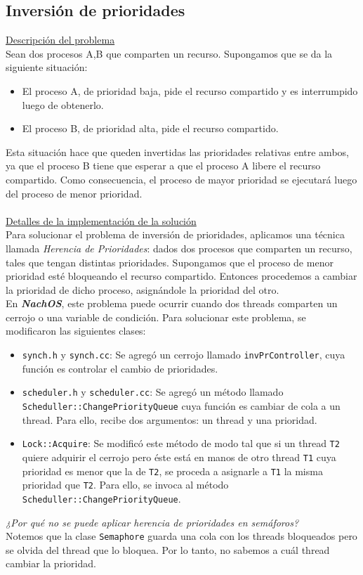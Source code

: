 \subsection*{Inversión de prioridades}
\textsf{\underline{Descripción del problema}}\\
Sean dos procesos A,B que comparten un recurso. Supongamos que se da la siguiente situación:
\begin{itemize}
    \item El proceso A, de prioridad baja, pide el recurso compartido y es interrumpido luego de obtenerlo.
    \item El proceso B, de prioridad alta, pide el recurso compartido.
\end{itemize}
Esta situación hace que queden invertidas las prioridades relativas entre ambos, ya que el proceso B tiene que esperar a que el proceso A libere el recurso compartido. Como consecuencia, el proceso de mayor prioridad se ejecutará luego del proceso de menor prioridad.\\
\\\textsf{\underline{Detalles de la implementación de la solución}}\\
Para solucionar el problema de inversión de prioridades, aplicamos una técnica llamada \emph{Herencia de Prioridades}: dados dos procesos que comparten un recurso, tales que tengan distintas prioridades. Supongamos que el proceso de menor prioridad esté bloqueando el recurso compartido. Entonces procedemos a cambiar la prioridad de dicho proceso, asignándole la prioridad del otro.\\
En \textbf{\textit{NachOS}}, este problema puede ocurrir cuando dos threads comparten un cerrojo o una variable de condición. Para solucionar este problema, se modificaron las siguientes clases:
\begin{itemize}
    \item \texttt{synch.h} y \texttt{synch.cc}: Se agregó un cerrojo llamado \texttt{invPrController}, cuya función es controlar el cambio de prioridades.
    \item \texttt{scheduler.h} y \texttt{scheduler.cc}: Se agregó un método llamado \texttt{Scheduller::ChangePriorityQueue} cuya función es cambiar de cola a un thread. Para ello, recibe dos argumentos: un thread y una prioridad.
    \item \texttt{Lock::Acquire}: Se modificó este método de modo tal que si un thread \texttt{T2} quiere adquirir el cerrojo pero éste está en manos de otro thread \texttt{T1} cuya prioridad es menor que la de \texttt{T2}, se proceda a asignarle a \texttt{T1} la misma prioridad que \texttt{T2}. Para ello, se invoca al método \texttt{Scheduller::ChangePriorityQueue}.
\end{itemize}
\textit{¿Por qué no se puede aplicar herencia de prioridades en semáforos?}\\
Notemos que la clase \texttt{Semaphore} guarda una cola con los threads bloqueados pero se olvida del thread que lo bloquea. Por lo tanto, no sabemos a cuál thread cambiar la prioridad.